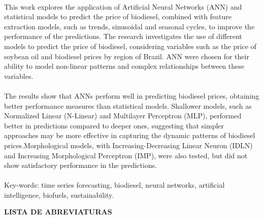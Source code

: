 \paragraph{} This work explores the application of Artificial Neural Networks (ANN) and statistical models to predict the price of biodiesel, combined with feature extraction models, such as trends, sinusoidal and seasonal cycles, to improve the performance of the predictions. The research investigates the use of different models to predict the price of biodiesel, considering variables such as the price of soybean oil and biodiesel prices by region of Brazil. ANN were chosen for their ability to model non-linear patterns and complex relationships between these variables.

\paragraph{} The results show that ANNs perform well in predicting biodiesel prices, obtaining better performance measures than statistical models. Shallower models, such as Normalized Linear (\acs{N-Linear}) and Multilayer Perceptron (\acs{MLP}), performed better in predictions compared to deeper ones, suggesting that simpler approaches may be more effective in capturing the dynamic patterns of biodiesel prices.Morphological models, with Increasing-Decreasing Linear Neuron (\acs{IDLN}) and Increasing Morphological Perceptron (\acs{IMP}), were also tested, but did not show satisfactory performance in the predictions.
\paragraph{}
\noindent Key-words: time series forecasting, biodiesel, neural networks, artificial intelligence, biofuels, sustainability.

\pagebreak


\begin{center}
	\textbf{LISTA DE ABREVIATURAS}
\end{center}
\vspace{0.5cm}

%
\printacronyms[heading=none]


\pagebreak







